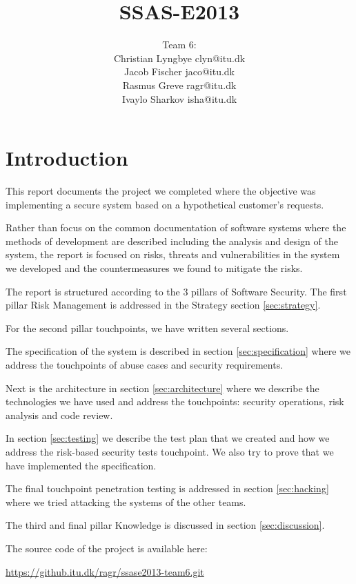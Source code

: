 \documentclass[a4paper]{article}
\title{SSAS-E2013}
\author{Team 6:\\Christian Lyngbye clyn@itu.dk\\Jacob Fischer jaco@itu.dk\\Rasmus Greve ragr@itu.dk\\Ivaylo Sharkov isha@itu.dk}
\begin{document}
\maketitle

\newpage
\tableofcontents

\newpage
\section{Introduction}
This report documents the project we completed where the objective was implementing a secure system based on a hypothetical customer's requests.

Rather than focus on the common documentation of software systems where the methods of development are described including the analysis and design of the system, the report is focused on risks, threats and vulnerabilities in the system we developed and the countermeasures we found to mitigate the risks.

The report is structured according to the 3 pillars of Software Security\cite{McGraw2006}. 
The first pillar Risk Management is addressed in the Strategy section \ref{sec:strategy}.

For the second pillar touchpoints, we have written several sections.

The specification of the system is described in section \ref{sec:specification} where we address the touchpoints of abuse cases and security requirements.

Next is the architecture in section \ref{sec:architecture} where we describe the technologies we have used and address the touchpoints: security operations, risk analysis and code review.

In section \ref{sec:testing} we describe the test plan that we created and how we address the risk-based security tests touchpoint. We also try to prove that we have implemented the specification.

The final touchpoint penetration testing is addressed in section \ref{sec:hacking} where we tried attacking the systems of the other teams. 

The third and final pillar Knowledge is discussed in section \ref{sec:discussion}.

The source code of the project is available here:

\href{https://github.itu.dk/ragr/ssase2013-team6.git}{https://github.itu.dk/ragr/ssase2013-team6.git}

\end{document}

